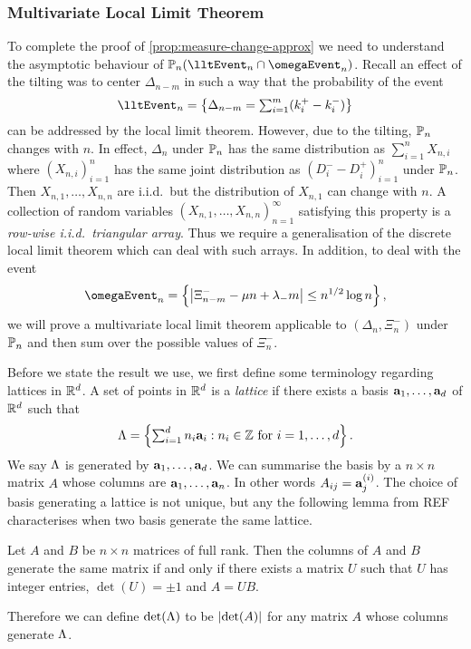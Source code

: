 \subsubsection{Multivariate Local Limit Theorem}

To complete the proof of \cref{prop:measure-change-approx} we need to understand the asymptotic behaviour of $\P_n(\lltEvent_n \cap \omegaEvent_n)$. Recall an effect of the tilting was to center $\Delta_{n-m}$ in such a way that the probability of the event
\begin{equation*}
    \lltEvent_n = \left\{ 
        \Delta_{n-m} = \textstyle \sum_{i=1}^m (k_i^+ - k_i^-)
    \right\}
\end{equation*}
can be addressed by the local limit theorem. However, due to the tilting, $\P_n$ changes with $n$. In effect, $\Delta_n$ under $\P_n$ has the same distribution as $\sum_{i=1}^n X_{n, i}$ where $(X_{n, i})_{i=1}^n$ has the same joint distribution as $(D_i^- - D_i^+)_{i=1}^n$ under $\P_n$. Then $X_{n, 1}, \ldots, X_{n, n}$ are i.i.d.\ but the distribution of $X_{n, 1}$ can change with $n$. A collection of random variables $(X_{n, 1}, \ldots, X_{n, n})_{n = 1}^{\infty}$ satisfying this property is a \emph{row-wise i.i.d.\ triangular array}. Thus we require a generalisation of the discrete local limit theorem which can deal with such arrays. In addition, to deal with the event
\begin{equation*}
    \omegaEvent_n = \left\{ 
        \abs*{\Xi_{n-m}^- - \mu n + \lambda_- m} \leq n^{1/2} \log n
    \right\},
\end{equation*}
we will prove a multivariate local limit theorem applicable to $(\Delta_n, \Xi^-_n)$ under $\P_n$ and then sum over the possible values of $\Xi^-_n$.

Before we state the result we use, we first define some terminology regarding lattices in $\R^d$. A set of points in $\R^d$ is a \emph{lattice} if there exists a basis $\va_1, \ldots, \va_d$ of $\R^d$ such that
\begin{equation*}
    \lattice = \left\{ 
        \textstyle \sum_{i=1}^d n_i \va_i : n_i \in \Z \text{ for $i = 1, \ldots, d$}
    \right\}.
\end{equation*}
We say $\lattice$ is generated by $\va_1, \ldots, \va_d$. We can summarise the basis by a $n \times n$ matrix $A$ whose columns are $\va_1, \ldots, \va_n$. In other words $A_{ij} = \va_j^{(i)}$. The choice of basis generating a lattice is not unique, but any the following lemma from REF characterises when two basis generate the same lattice.
\begin{lemma}
    Let $A$ and $B$ be $n \times n$ matrices of full rank. Then the columns of $A$ and $B$ generate the same matrix if and only if there exists a matrix $U$ such that $U$ has integer entries, $\det(U) = \pm 1$ and $A = UB$.
\end{lemma}
Therefore we can define $\det(\lattice)$ to be $\abs{\det(A)}$ for any matrix $A$ whose columns generate $\lattice$.

